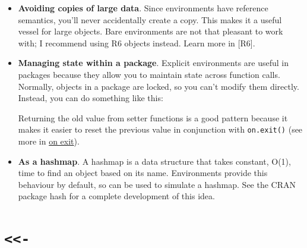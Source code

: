 \documentclass[]{book}
\newenvironment{Shaded}{\begin{snugshade}}{\end{snugshade}}
\newcommand{\KeywordTok}[1]{\textcolor[rgb]{0.13,0.29,0.53}{\textbf{#1}}}
\newcommand{\DataTypeTok}[1]{\textcolor[rgb]{0.13,0.29,0.53}{#1}}
\newcommand{\DecValTok}[1]{\textcolor[rgb]{0.00,0.00,0.81}{#1}}
\newcommand{\StringTok}[1]{\textcolor[rgb]{0.31,0.60,0.02}{#1}}
\newcommand{\ControlFlowTok}[1]{\textcolor[rgb]{0.13,0.29,0.53}{\textbf{#1}}}
\newcommand{\OperatorTok}[1]{\textcolor[rgb]{0.81,0.36,0.00}{\textbf{#1}}}
\newcommand{\NormalTok}[1]{#1}
\theoremstyle{definition}
\theoremstyle{definition}
\theoremstyle{definition}
\theoremstyle{remark}
\begin{document}
\begin{itemize}
\item
  \textbf{Avoiding copies of large data}. Since environments have
  reference semantics, you'll never accidentally create a copy. This
  makes it a useful vessel for large objects. Bare environments are not
  that pleasant to work with; I recommend using R6 objects instead.
  Learn more in {[}R6{]}.
\item
  \textbf{Managing state within a package}. Explicit environments are
  useful in packages because they allow you to maintain state across
  function calls. Normally, objects in a package are locked, so you
  can't modify them directly. Instead, you can do something like this:

\begin{Shaded}
\end{Shaded}

  Returning the old value from setter functions is a good pattern
  because it makes it easier to reset the previous value in conjunction
  with \texttt{on.exit()} (see more in \protect\hyperlink{on-exit}{on
  exit}).
\item
  \textbf{As a hashmap}. A hashmap is a data structure that takes
  constant, O(1), time to find an object based on its name. Environments
  provide this behaviour by default, so can be used to simulate a
  hashmap. See the CRAN package hash for a complete development of this
  idea.
\end{itemize}

\section{\texorpdfstring{\texttt{\textless{}\textless{}-}}{\textless{}\textless{}-}}\label{section}
\end{document}

